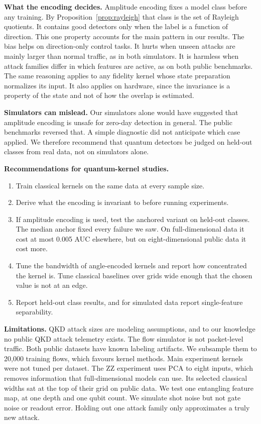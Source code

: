 \documentclass[pdflatex,sn-mathphys-num,lineno]{sn-jnl}
\theoremstyle{thmstyleone}
\begin{document}
\textbf{What the encoding decides.} Amplitude encoding fixes a model class before
any training. By Proposition~\ref{prop:rayleigh} that class is the set of Rayleigh
quotients. It contains good detectors only when the label is a function of
direction. This one property accounts for the main pattern in our
results. The bias helps on direction-only control tasks. It hurts when unseen
attacks are mainly larger than normal traffic, as in both simulators. It is
harmless when attack families differ in which features are active, as on both
public benchmarks. The same reasoning applies to any fidelity kernel whose state
preparation normalizes its input. It also applies on hardware, since the
invariance is a property of the state and not of how the overlap is estimated.

\textbf{Simulators can mislead.} Our simulators alone would have suggested that
amplitude encoding is unsafe for zero-day detection in general. The public
benchmarks reversed that. A simple diagnostic did not anticipate which case
applied. We therefore recommend that quantum detectors be judged on held-out
classes from real data, not on simulators alone.

\textbf{Recommendations for quantum-kernel studies.}
\begin{enumerate}
\item Train classical kernels on the same data at every sample size.
\item Derive what the encoding is invariant to before running experiments.
\item If amplitude encoding is used, test the anchored variant on held-out
  classes. The median anchor fixed every failure we saw. On full-dimensional data
  it cost at most 0.005 AUC elsewhere, but on eight-dimensional public data it
  cost more.
\item Tune the bandwidth of angle-encoded kernels and report how concentrated the
  kernel is. Tune classical baselines over grids wide enough that the chosen value
  is not at an edge.
\item Report held-out class results, and for simulated data report single-feature
  separability.
\end{enumerate}

\textbf{Limitations.} QKD attack sizes are modeling assumptions, and to our
knowledge no public QKD attack telemetry exists. The flow simulator is not
packet-level traffic. Both public datasets have known labeling artifacts. We
subsample them to 20,000 training flows, which favours kernel methods. Main
experiment kernels were not tuned per dataset. The ZZ experiment uses PCA to eight
inputs, which removes information that full-dimensional models can use. Its
selected classical widths sat at the top of their grid on public data. We test one
entangling feature map, at one depth and one qubit count. We
simulate shot noise but not gate noise or readout error. Holding out one attack
family only approximates a truly new attack.
\end{document}
